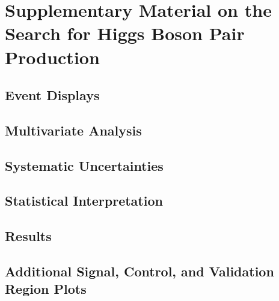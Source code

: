 \chapter{Supplementary Material on the Search for Higgs Boson Pair Production}

\section{Event Displays}%
\label{app:event_displays}

\clearpage

\section{Multivariate Analysis}%
\label{app:multivariate_analysis}

\clearpage

\section{Systematic Uncertainties}%
\label{app:uncertainties}

\clearpage

\section{Statistical Interpretation}%
\label{app:statistical_interpretation}

\clearpage

\section{Results}%
\label{app:results}

\clearpage

\section{Additional Signal, Control, and Validation Region Plots}%
\label{app:control_and_validation_regions}

\clearpage

% 

